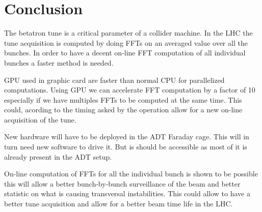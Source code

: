 
\chapter{Conclusion}


The betatron \gls{tune} is a critical parameter of a collider machine. In the \gls{LHC} the \gls{tune} acquisition is computed by doing \glspl{FFT} on an averaged value over all the bunches. In order to have a decent on-line \gls{FFT} computation of all individual bunches a faster method is needed. 

\Gls{GPU} used in graphic card are faster than normal \gls{CPU} for parallelized computations. Using \gls{GPU} we can accelerate \gls{FFT} computation by a factor of 10 especially if we have multiples \glspl{FFT} to be computed at the same time. This could, acording to the timing asked by the operation allow for a new on-line acquisition of the \gls{tune}.

New hardware will have to be deployed in the \gls{ADT} Faraday cage. This will in turn need new software to drive it. But is should be accessible as most of it is already present in the \gls{ADT} setup.

On-line computation of \glspl{FFT} for all the individual bunch is shown to be possible this will allow a better bunch-by-bunch surveillance of the beam and better statistic on what is causing transversal instabilities. This could allow to have a better tune acquisition and allow for a better beam time life in the \gls{LHC}.